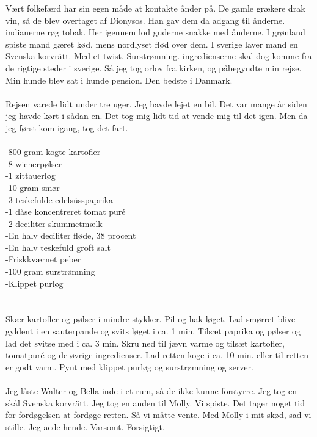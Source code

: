\documentclass[]{article}
\begin{document}
Vært folkefærd har sin egen måde at kontakte ånder på. De gamle grækere drak vin, så de blev overtaget af Dionysos. Han gav dem da adgang til ånderne. indianerne røg tobak. Her igennem lod guderne snakke med ånderne. I grønland spiste mand gæret kød, mens nordlyset flød over dem. I sverige laver mand en Svenska korvrätt. Med et twist. Surstrømning. ingredienserne skal dog komme fra de rigtige steder i sverige. Så jeg tog orlov fra kirken, og påbegyndte min rejse. Min hunde blev sat i hunde pension. Den bedste i Danmark.
\\ \\
Rejsen varede lidt under tre uger. Jeg havde lejet en bil. Det var mange år siden jeg havde kørt i sådan en. Det tog mig lidt tid at vende mig til det igen. Men da jeg først kom igang, tog det fart.
\\ \\
-800 gram kogte kartofler \\
-8 wienerpølser \\
-1 zittauerløg \\
-10 gram smør \\
-3 teskefulde edelsüsspaprika \\
-1 dåse koncentreret tomat puré \\
-2 deciliter skummetmælk \\
-En halv deciliter fløde, 38 procent \\
-En halv teskefuld groft salt \\
-Friskkværnet peber \\
-100 gram surstrømning \\
-Klippet purløg \\
\\ \\
Skær kartofler og pølser i mindre stykker. Pil og hak løget. Lad smørret blive gyldent i en sauterpande og svits løget i ca. 1 min. Tilsæt paprika og pølser og lad det svitse med i ca. 3 min. Skru ned til jævn varme og tilsæt kartofler, tomatpuré og de øvrige ingredienser. Lad retten koge i ca. 10 min. eller til retten er godt varm. Pynt med klippet purløg og surstrømning og server.
\\ \\
Jeg låste Walter og Bella inde i et rum, så de ikke kunne forstyrre. Jeg tog en skål Svenska korvrätt. Jeg tog en anden til Molly. Vi spiste. Det tager noget tid for fordøgelsen at fordøge retten. Så vi måtte vente. Med Molly i mit skød, sad vi stille. Jeg aede hende. Varsomt. Forsigtigt. 
\\ \\
\end{document}
